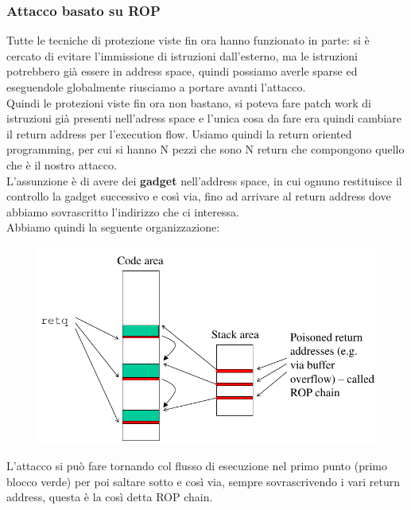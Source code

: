 \documentclass[12pt, oneside]{extbook}
\begin{document}
\subsubsection{Attacco basato su ROP}
Tutte le tecniche di protezione viste fin ora hanno funzionato in parte: si è cercato di evitare l'immissione di istruzioni dall'esterno, ma le istruzioni potrebbero già essere in address space, quindi possiamo averle sparse ed eseguendole globalmente riusciamo a portare avanti l'attacco.\\Quindi le protezioni viste fin ora non bastano, si poteva fare patch work di istruzioni già presenti nell'adress space e l'unica cosa da fare era quindi cambiare il return address per l'execution flow. Usiamo quindi la return oriented programming, per cui si hanno N pezzi che sono N return che compongono quello che è il nostro attacco.\\L'assunzione è di avere dei \textbf{gadget} nell'address space, in cui ognuno restituisce il controllo la gadget successivo e così via, fino ad arrivare al return address dove abbiamo sovrascritto l'indirizzo che ci interessa.\\Abbiamo quindi la seguente organizzazione:
\begin{figure}[!h]
	\includegraphics[scale=0.5]{immagini/rop_scheme.png}
\end{figure}
L'attacco si può fare tornando col flusso di esecuzione nel primo punto (primo blocco verde) per poi saltare sotto e così via, sempre sovrascrivendo i vari return address, questa è la così detta ROP chain.
\end{document}
